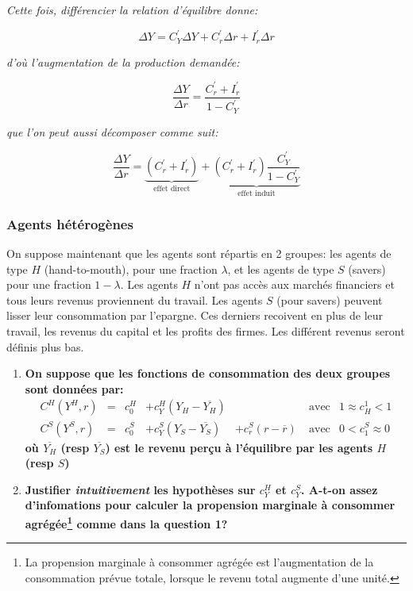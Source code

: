 \documentclass[
]{article}
\begin{document}
\emph{Cette fois, différencier la relation d'équilibre donne:}

\[\Delta Y = C_Y^{\prime} \Delta Y + C_r^{\prime} \Delta r + I_r^{\prime} \Delta r\]

\emph{d'où l'augmentation de la production demandée:}

\[\frac{\Delta Y}{\Delta r} = \frac{ C_r^{\prime} + I_r^{\prime}} {1-C_Y^{\prime}}\]

\emph{que l'on peut aussi décomposer comme suit:}

\[\frac{\Delta Y}{\Delta r} = \underbrace{\left(C_r^{\prime} + I_r^{\prime}\right)}_{\text{effet direct}}  + \underbrace{ \left( C_r^{\prime} + I_r^{\prime} \right) \frac{C_Y^{\prime}} {1-C_Y^{\prime}} }_{\text{effet induit}}\]

\hypertarget{agents-huxe9tuxe9roguxe8nes}{%
\subsubsection{Agents hétérogènes}\label{agents-huxe9tuxe9roguxe8nes}}

On suppose maintenant que les agents sont répartis en 2 groupes: les
agents de type \(H\) (hand-to-mouth), pour une fraction \(\lambda\), et
les agents de type \(S\) (savers) pour une fraction \(1-\lambda\). Les
agents \(H\) n'ont pas accès aux marchés financiers et tous leurs
revenus proviennent du travail. Les agents \(S\) (pour savers) peuvent
lisser leur consommation par l'epargne. Ces derniers recoivent en plus
de leur travail, les revenus du capital et les profits des firmes. Les
différent revenus seront définis plus bas.

\begin{enumerate}
\def\labelenumi{\arabic{enumi}.}
\setcounter{enumi}{4}
\item
  \textbf{On suppose que les fonctions de consommation des deux groupes
  sont données par:} \begin{align}
  C^H(Y^H,r) & = & c^H_0 & + c^H_Y (Y_H - \overline{Y_H}) &  & \;\text{avec} & 1\approx c^1_H<1\\
  C^S(Y^S,r) & = & c^S_0 & + c^S_Y (Y_S - \overline{Y_S}) & + c^S_r (r-\overline{r}) & \;\text{avec} & 0<c_1^S\approx 0 
  \end{align} \textbf{où \(\overline{Y_H}\) (resp \(\overline{Y_S}\))
  est le revenu perçu à l'équilibre par les agents \(H\) (resp \(S\))}
\item
  \textbf{Justifier \emph{intuitivement} les hypothèses sur \(c^H_Y\) et
  \(c^S_Y\). A-t-on assez d'infomations pour calculer la propension
  marginale à consommer agrégée\footnote{La propension marginale à
    consommer agrégée est l'augmentation de la consommation prévue
    totale, lorsque le revenu total augmente d'une unité.} comme dans la
  question 1?}
\end{enumerate}
\end{document}
